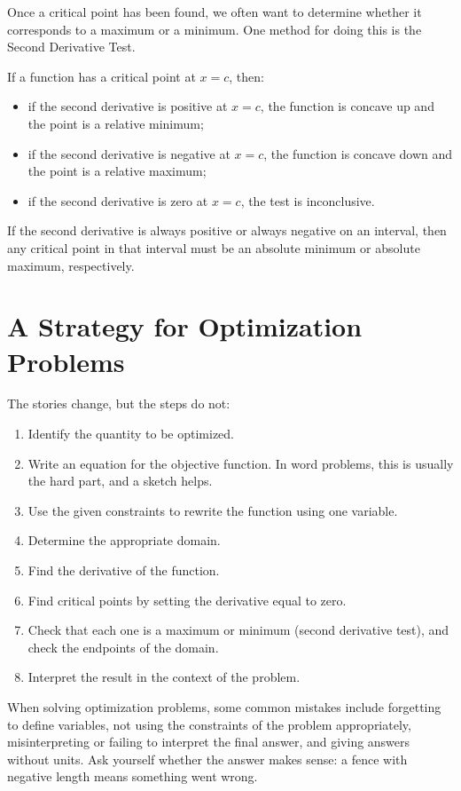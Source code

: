 Once a critical point has been found, we often want to determine whether
it corresponds to a maximum or a minimum. One method for doing this is
the Second Derivative Test. 

If a function has a critical point at $x = c$, then:
\begin{itemize}
\item if the second derivative is positive at $x = c$, the function is
concave up and the point is a relative minimum;
\item if the second derivative is negative at $x = c$, the function is
concave down and the point is a relative maximum;
\item if the second derivative is zero at $x = c$, the test is
inconclusive.
\end{itemize}

If the second derivative is always positive or always negative on an
interval, then any critical point in that interval must be an absolute
minimum or absolute maximum, respectively.

\section{A Strategy for Optimization Problems}

The stories change, but the steps do not:

\begin{enumerate}
\item Identify the quantity to be optimized.
\item Write an equation for the objective function. In word problems, this is usually the hard part, and a sketch helps.
\item Use the given constraints to rewrite the function using one
variable.
\item Determine the appropriate domain.
\item Find the derivative of the function.
\item Find critical points by setting the derivative equal to zero.
\item Check that each one is a maximum or minimum (second derivative test), and check the endpoints of the domain.
\item Interpret the result in the context of the problem.
\end{enumerate}

When solving optimization problems, some common mistakes include
forgetting to define variables, not using the constraints of the
problem appropriately, misinterpreting or failing to interpret the
final answer, and giving answers without units. Ask yourself whether
the answer makes sense: a fence with negative length means something went
wrong.

